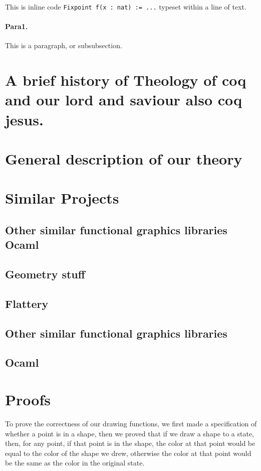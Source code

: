 \documentclass{llncs}
\begin{document}
This is inline code \lstinline|Fixpoint f(x : nat) := ...| typeset within a line of text.

\paragraph{Para1.} This is a paragraph, or subsubsection.

\section{A brief history of Theology of coq and our lord and saviour also coq jesus.}

\section{General description of our theory}

\section{Similar Projects}
\subsection{Other similar functional graphics libraries Ocaml}
\subsection{Geometry stuff}

\subsection{Flattery}

\subsection{Other similar functional graphics libraries} 

\subsection{Ocaml}

\section{Proofs}
To prove the correctness of our drawing functions, we first made a specification of whether a point is in a shape, then we proved that if we draw a shape to a state, then, for any point, if that point is in the shape, the color at that point would be equal to the color of the shape we drew, otherwise the color at that point would be the same as the color in the original state.
\end{document}
